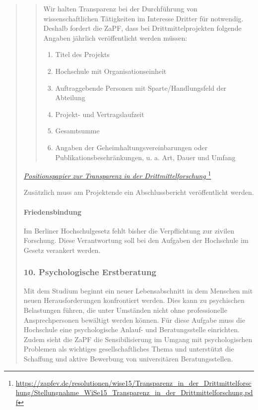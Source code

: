 \documentclass[DIV=14]{scrartcl}
\begin{document}
\begin{quote}
\begin{quote}
Wir halten Transparenz bei der Durchführung von wissenschaftlichen Tätigkeiten im Interesse Dritter für notwendig. Deshalb fordert die ZaPF, dass bei Drittmittelprojekten folgende Angaben jährlich veröffentlicht werden müssen:
\begin{enumerate}
\item Titel des Projekts
\item Hochschule mit Organisationseinheit
\item Auftraggebende Personen mit Sparte/Handlungsfeld der Abteilung
\item Projekt- und Vertragslaufzeit
\item Gesamtsumme
\item Angaben der Geheimhaltungsvereinbarungen oder Publikationsbeschränkungen,
  u. a. Art, Dauer und Umfang
\end{enumerate}
\end{quote}

\href{https://zapfev.de/resolutionen/wise15/Transparenz_in_der_Drittmittelforschung/Stellungnahme_WiSe15_Transparenz_in_der_Drittmittelforschung.pdf}{\emph{Positionspapier zur Transparenz in der Drittmittelforschung%
  }}\footnote{\url{https://zapfev.de/resolutionen/wise15/Transparenz_in_der_Drittmittelforschung/Stellungnahme_WiSe15_Transparenz_in_der_Drittmittelforschung.pdf}}

Zusätzlich muss am Projektende ein Abschlussbericht veröffentlicht werden.

\hypertarget{friedensbindung}{%
\paragraph{Friedensbindung}\label{friedensbindung}}
Im Berliner Hochschulgesetz fehlt bisher die Verpflichtung zur zivilen Forschung. Diese Verantwortung soll bei den Aufgaben der Hochschule im Gesetz verankert werden.


\hypertarget{psychologische-erstberatung}{%
\subsubsection*{10. Psychologische Erstberatung}\label{psychologische-erstberatung}}

Mit dem Studium beginnt ein neuer Lebensabschnitt in dem Menschen mit neuen Herausforderungen konfrontiert werden. Dies kann zu psychischen Belastungen führen, die unter Umständen nicht ohne professionelle Ansprechpersonen bewältigt werden können. Für diese Aufgabe muss die Hochschule eine psychologische Anlauf- und Beratungsstelle einrichten. Zudem sieht die ZaPF die Sensibilisierung im Umgang mit psychologischen Problemen als wichtiges gesellschaftliches Thema und unterstützt die Schaffung und aktive Bewerbung von universitären Beratungsstellen.
\end{quote}
\end{document}
